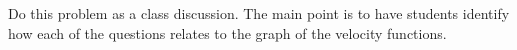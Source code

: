 \documentclass[]{ximera}
\begin{document}
\begin{instructorNotes}
Do this problem as a class discussion.  
The main point is to have students identify how each of the questions relates to the graph of the velocity functions.
\end{instructorNotes}
















	
	
	
	
	
	
	
	
	

	










								
				
				
	
\end{document}
